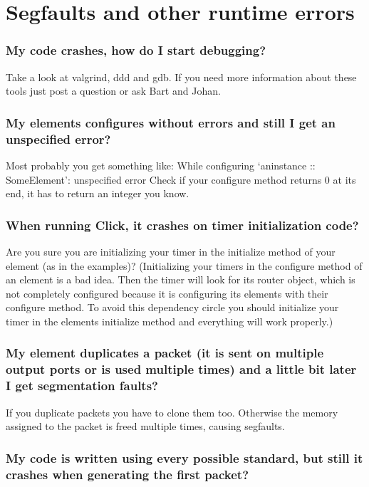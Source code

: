 \documentclass[a4paper]{article}
\begin{document}
\section{Segfaults and other runtime errors}

\subsubsection*{My code crashes, how do I start debugging?}

Take a look at valgrind, ddd and gdb. If you need more information about
these tools just post a question or ask Bart and Johan.

\subsubsection*{My elements configures without errors and still I get an unspecified
error?}

Most probably you get something like: While configuring `aninstance ::
SomeElement': unspecified error Check if your configure method returns 0
at its end, it has to return an integer you know.

\subsubsection*{When running Click, it crashes on timer initialization code?}

Are you sure you are initializing your timer in the initialize method of
your element (as in the examples)? (Initializing your timers in the
configure method of an element is a bad idea. Then the timer will look
for its router object, which is not completely configured because it is
configuring its elements with their configure method. To avoid this
dependency circle you should initialize your timer in the elements
initialize method and everything will work properly.)

\subsubsection*{My element duplicates a packet (it is sent on multiple output ports or
is used multiple times) and a little bit later I get segmentation
faults?}

If you duplicate packets you have to clone them too. Otherwise the
memory assigned to the packet is freed multiple times, causing
segfaults.

\subsubsection*{My code is written using every possible standard, but still it crashes
when generating the first packet?}
\end{document}
